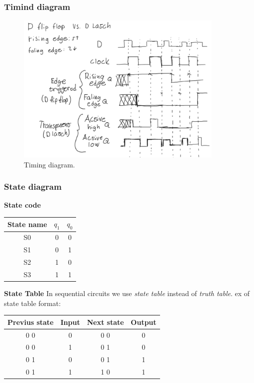 \newpage
\subsubsection{Timind diagram}
\begin{figure}[h]
    \vspace{10mm}
    \centering
    \includegraphics[width=10cm]{image/timing-diagram.pdf}
    \caption{Timing diagram.}
\end{figure}


\subsubsection{State diagram}
\textbf{State code}
\begin{center}
\begin{tabular}{ | c | c c | }
    \hline
 State name & $q_1$ & $q_0$  \\ 
    \hline
 S0 & 0 & 0 \\
    \hline
 S1 & 0 & 1 \\
    \hline
 S2 & 1 & 0 \\
    \hline
 S3 & 1 & 1 \\
    \hline
\end{tabular}
\end{center}


\textbf{State Table}
In sequential circuits we use \textit{state table} instead of \textit{truth table}.
ex of state table format:
\begin{center}
\begin{tabular}{ | c | c | c | c | }
    \hline
 Previus state & Input & Next state & Output \\ 
    \hline
 0 0 & 0 & 0 0 & 0 \\ 
    \hline
 0 0 & 1 & 0 1 & 0 \\ 
    \hline
 0 1 & 0 & 0 1 & 1 \\ 
    \hline
 0 1 & 1 & 1 0 & 1 \\ 
    \hline
\end{tabular}
\end{center}

